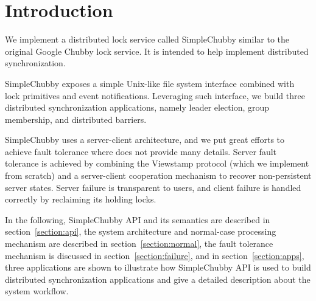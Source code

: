 \section{Introduction}

We implement a distributed lock service called SimpleChubby
similar to the original Google Chubby lock service\cite{burrows2006chubby}.
It is intended to help implement distributed synchronization.

SimpleChubby exposes a simple Unix-like file system interface
combined with lock primitives and event notifications.
Leveraging such interface, we build three distributed synchronization
applications, namely leader election, group membership, and distributed barriers.

SimpleChubby uses a server-client architecture,
and we put great efforts to achieve fault tolerance
where \cite{burrows2006chubby} does not provide many details.
Server fault tolerance is achieved by combining the Viewstamp protocol \cite{oki1988viewstamped}
(which we implement from scratch) and a server-client cooperation mechanism
to recover non-persistent server states.
Server failure is transparent to users, and client failure
is handled correctly by reclaiming its holding locks.

In the following,
SimpleChubby API and its semantics are described in section~\ref{section:api},
the system architecture and normal-case processing mechanism
are described in section~\ref{section:normal},
the fault tolerance mechanism is discussed in section~\ref{section:failure},
and in section~\ref{section:apps},
three applications are shown to illustrate
how SimpleChubby API is used to build
distributed synchronization applications
and give a detailed description about the system workflow.
